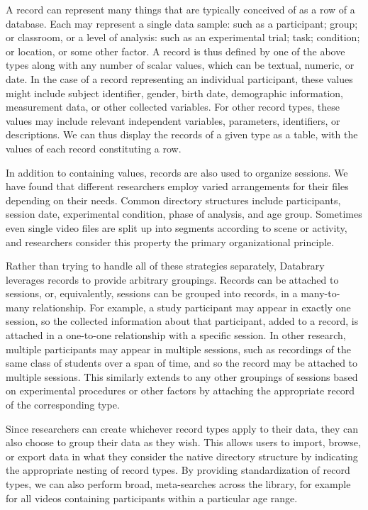 \documentclass{sig-alternate}
\begin{document}
A record can represent many things that are typically conceived of as a row of a database.
Each may represent a single data sample: such as a participant; group; or classroom, or a level of analysis: such as an experimental trial; task; condition; or location, or some other factor. 
A record is thus defined by one of the above types along with any number of scalar values, which can be textual, numeric, or date.
In the case of a record representing an individual participant, these values might include subject identifier, gender, birth date, demographic information, measurement data, or other collected variables.
For other record types, these values may include relevant independent variables, parameters, identifiers, or descriptions. 
We can thus display the records of a given type as a table, with the values of each record constituting a row.

In addition to containing values, records are also used to organize sessions.
We have found that different researchers employ varied arrangements for their files depending on their needs.
Common directory structures include participants, session date, experimental condition, phase of analysis, and age group.
Sometimes even single video files are split up into segments according to scene or activity, and researchers consider this property the primary organizational principle.

Rather than trying to handle all of these strategies separately, Databrary leverages records to provide arbitrary groupings.
Records can be attached to sessions, or, equivalently, sessions can be grouped into records, in a many-to-many relationship.
For example, a study participant may appear in exactly one session, so the collected information about that participant, added to a record, is attached in a one-to-one relationship with a specific session.
In other research, multiple participants may appear in multiple sessions, such as recordings of the same class of students over a span of time, and so the record may be attached to multiple sessions.
This similarly extends to any other groupings of sessions based on experimental procedures or other factors by attaching the appropriate record of the corresponding type.

Since researchers can create whichever record types apply to their data, they can also choose to group their data as they wish.
This allows users to import, browse, or export data in what they consider the native directory structure by indicating the appropriate nesting of record types.
By providing standardization of record types, we can also perform broad, meta-searches across the library, for example for all videos containing participants within a particular age range.
\end{document}
